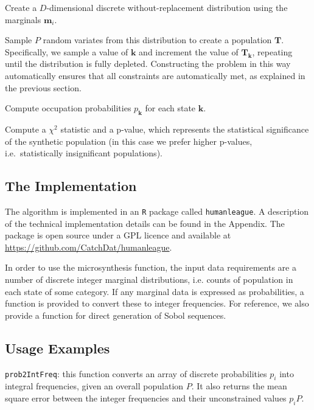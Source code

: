 \documentclass{JASSS}
\begin{document}
\begin{enumerate*}
\item
  Create a \(D\)-dimensional discrete without-replacement distribution
  using the marginals \(\mathbf{m}_i\).
\item
  Sample \(P\) random variates from this distribution to create a
  population \(\mathbf{T}\). Specifically, we sample a value of
  \(\mathbf{k}\) and increment the value of \(\mathbf{T}_\mathbf{k}\),
  repeating until the distribution is fully depleted. Constructing the
  problem in this way automatically ensures that all constraints are
  automatically met, as explained in the previous section.
\item
  Compute occupation probabilities \(p_\mathbf{k}\) for each state
  \(\mathbf{k}\).
\item
  Compute a \(\chi^2\) statistic and a p-value, which represents the
  statistical significance of the synthetic population (in this case we
  prefer higher p-values, i.e.~statistically insignificant populations).
\end{enumerate*}

\subsection{The Implementation}\label{the-implementation}

The algorithm is implemented in an \texttt{R} package called
\texttt{humanleague}. A description of the technical implementation details can be found in the Appendix. The package is open source under a GPL licence and available at \url{https://github.com/CatchDat/humanleague}.

In order to use the microsynthesis function, the input data requirements are a number of discrete integer marginal distributions, i.e. counts of population in each state of some category. If any marginal data is expressed as probabilities, a function is provided to convert these to integer frequencies. For reference, we also provide a function for direct generation of Sobol sequences.

\subsection{Usage Examples}\label{usage-examples}

\texttt{prob2IntFreq}: this function converts an array of discrete probabilities \(p_i\) into integral frequencies, given an overall population \(P\). It also returns the mean square error between the integer frequencies and their unconstrained values \(p_iP\).
\end{document}
